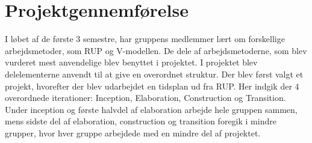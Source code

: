 \section{Projektgennemførelse}
\label{chap:projektgennemfoerelse}

I løbet af de første 3 semestre, har gruppens medlemmer lært om forskellige arbejdsmetoder, som RUP og V-modellen. De dele af arbejdsmetoderne, som blev vurderet mest anvendelige blev benyttet i projektet. I projektet blev delelementerne anvendt til at give en overordnet struktur.\newline
Der blev først valgt et projekt, hvorefter der blev udarbejdet en tidsplan ud fra RUP. Her indgik der 4 overordnede iterationer: Inception, Elaboration, Construction og Transition.\newline
Under inception og første halvdel af elaboration arbejde hele gruppen sammen, mens sidste del af elaboration, construction og transition foregik i mindre grupper, hvor hver gruppe arbejdede med en mindre del af projektet.  
